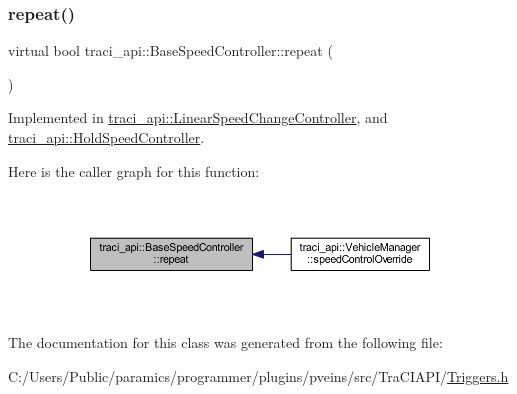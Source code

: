 \subsubsection{\texorpdfstring{repeat()}{repeat()}}
{\footnotesize\ttfamily virtual bool traci\+\_\+api\+::\+Base\+Speed\+Controller\+::repeat (\begin{DoxyParamCaption}{ }\end{DoxyParamCaption})\hspace{0.3cm}{\ttfamily [pure virtual]}}



Implemented in \hyperlink{classtraci__api_1_1_linear_speed_change_controller_aaa5f31ea0c57db838a5786509fc03446}{traci\+\_\+api\+::\+Linear\+Speed\+Change\+Controller}, and \hyperlink{classtraci__api_1_1_hold_speed_controller_acf2f2b8595dd8a135b13be736ee29d63}{traci\+\_\+api\+::\+Hold\+Speed\+Controller}.

Here is the caller graph for this function\+:
\nopagebreak
\begin{figure}[H]
\begin{center}
\leavevmode
\includegraphics[width=350pt]{classtraci__api_1_1_base_speed_controller_a2d4b22945d4cb27f5fe24b05700021b6_icgraph}
\end{center}
\end{figure}


The documentation for this class was generated from the following file\+:\begin{DoxyCompactItemize}
\item 
C\+:/\+Users/\+Public/paramics/programmer/plugins/pveins/src/\+Tra\+C\+I\+A\+P\+I/\hyperlink{_triggers_8h}{Triggers.\+h}\end{DoxyCompactItemize}
